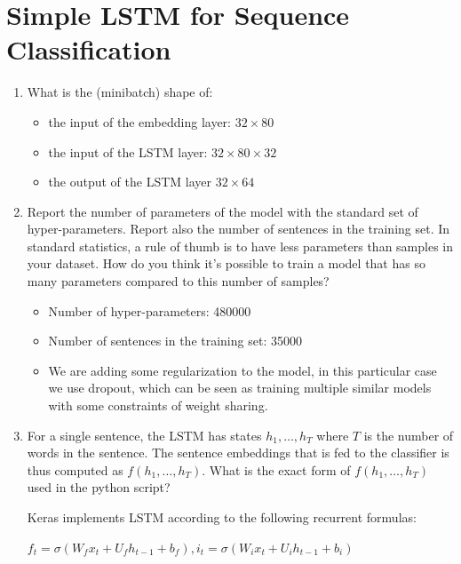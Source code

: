\documentclass{article} %
\begin{document}
\section{Simple LSTM for Sequence Classification}

\begin{enumerate}
    \item
    What is the (minibatch) shape of:

    \begin{itemize}
        \item
        the input of the embedding layer: $32 \times 80$
        \item
        the input of the LSTM layer: $32 \times 80 \times 32$
        \item
        the output of the LSTM layer $32 \times 64$
    \end{itemize}

    \item
    Report the number of parameters of the model with the standard set of hyper-parameters.
    Report also the number of sentences in the training set. In standard statistics,
    a rule of thumb is to have less parameters than samples in your dataset.
    How do you think it’s possible to train a model that has so many parameters
    compared to this number of samples?

    \begin{itemize}
        \item
        Number of hyper-parameters: 480000
        \item
        Number of sentences in the training set: 35000
        \item
        We are adding some regularization to the model, in this particular case
        we use dropout, which can be seen as training multiple similar models
        with some constraints of weight sharing.
    \end{itemize}

    \item
    For a single sentence, the LSTM has states $h_1, \ldots, h_T$ where $T$ is
    the number of words in the sentence. The sentence embeddings that is fed to
    the classifier is thus computed as $f(h_1, \ldots, h_T)$. What is the exact
    form of $f(h_1, \ldots, h_T)$ used in the python script?

    Keras implements LSTM according to the following recurrent formulas:

    \begin{center}
        $f_t = \sigma(W_f x_t + U_f h_{t - 1} + b_f), i_t = \sigma(W_i x_t + U_i h_{t - 1} + b_i)$


\end{center}
\end{enumerate}
\end{document}
